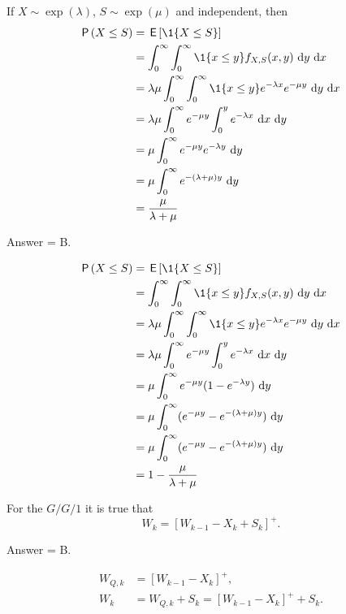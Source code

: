 \begin{exercise}[201704] %
   If $X\sim \exp(\lambda)$, $S\sim\exp(\mu)$ and independent, 
then
\begin{equation*}
  \begin{split}
    \P{X\leq S} 
&= \E{\1{X\leq S}} \\
&= \int_0^\infty \int_0^\infty \1{x\leq y} f_{X,S}(x,y)\, \d y\,\d x\\
&= \lambda \mu \int_0^\infty \int_0^\infty \1{x\leq y} e^{-\lambda x} e^{-\mu y} \, \d y\,\d x\\
&= \lambda \mu \int_0^\infty e^{-\mu y} \int_0^y e^{-\lambda x}\, \d x \, \d y \\
&= \mu \int_0^\infty e^{-\mu y} e^{-\lambda y}\,\d y\\
&= \mu \int_0^\infty e^{-(\lambda +\mu)y} \,\d y\\
&= \frac{\mu}{\lambda + \mu} 
  \end{split}
\end{equation*}

\begin{solution}
Answer = B.

\begin{equation*}
  \begin{split}
    \P{X\leq S} 
&= \E{\1{X\leq S}} \\
&= \int_0^\infty \int_0^\infty \1{x\leq y} f_{X,S}(x,y)\, \d y\,\d x\\
&= \lambda \mu \int_0^\infty \int_0^\infty \1{x\leq y} e^{-\lambda x} e^{-\mu y} \, \d y\,\d x\\
&= \lambda \mu \int_0^\infty e^{-\mu y} \int_0^y e^{-\lambda x}\, \d x \, \d y \\
&= \mu \int_0^\infty e^{-\mu y} (1-e^{-\lambda y})\,\d y\\
&= \mu \int_0^\infty (e^{-\mu y} - e^{-(\lambda +\mu)y} ) \,\d y\\
&= \mu \int_0^\infty (e^{-\mu y} - e^{-(\lambda +\mu)y} ) \,\d y\\
&= 1 - \frac{\mu}{\lambda + \mu} 
  \end{split}
\end{equation*}

\end{solution}
\end{exercise}

\begin{exercise}[201704] %
For the $G/G/1$ it is true that
\begin{equation*}
  W_{k} = [W_{k-1} - X_k + S_k]^+.
\end{equation*}

\begin{solution}
  Answer = B.

\begin{equation}
  \begin{split}
  W_{Q,k} &= [W_{k-1} - X_k]^+,\\
  W_{k} &= W_{Q,k} + S_k = [W_{k-1} - X_k]^+ + S_k.
  \end{split}
\end{equation}
\end{solution}
\end{exercise}

